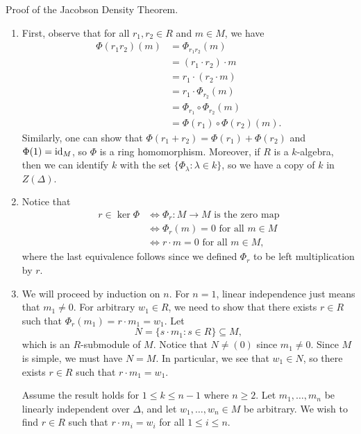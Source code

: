 {\sc Proof of the Jacobson Density Theorem.}
\begin{enumerate}[(1)]
    \item First, observe that for all $r_1, r_2 \in R$ and $m \in M$, we have
    \begin{align*}
        \Phi(r_1r_2)(m) &= \Phi_{r_1r_2}(m) \\
        &= (r_1 \cdot r_2) \cdot m \\
        &= r_1 \cdot (r_2 \cdot m) \\
        &= r_1 \cdot \Phi_{r_2}(m) \\
        &= \Phi_{r_1} \circ \Phi_{r_2}(m) \\
        &= \Phi(r_1) \circ \Phi(r_2)(m).
    \end{align*}
    Similarly, one can show that $\Phi(r_1 + r_2) = \Phi(r_1) + \Phi(r_2)$ and $\Phi(1) = \operatorname{id}_M$, so 
    $\Phi$ is a ring homomorphism. Moreover, if $R$ is a $k$-algebra, then we can identify 
    $k$ with the set $\{\Phi_\lambda : \lambda \in k\}$, so we have a copy of $k$ in $Z(\Delta)$. 
    
    \item Notice that 
    \begin{align*}
        r \in \ker\Phi &\iff \Phi_r : M \to M \text{ is the zero map} \\
        &\iff \Phi_r(m) = 0 \text{ for all $m \in M$} \\
        &\iff r \cdot m = 0 \text{ for all $m \in M$,}
    \end{align*}
    where the last equivalence follows since we defined $\Phi_r$ to be left multiplication by $r$.
    
    \item We will proceed by induction on $n$. For $n = 1$, linear independence just means that 
    $m_1 \neq 0$. For arbitrary $w_1 \in R$, we need to show that there exists $r \in R$ such that 
    $\Phi_r(m_1) = r \cdot m_1 = w_1$. Let 
    \[ N = \{s \cdot m_1 : s \in R\} \subseteq M, \]
    which is an $R$-submodule of $M$. Notice that $N \neq (0)$ since $m_1 \neq 0$. Since $M$ is 
    simple, we must have $N = M$. In particular, we see that $w_1 \in N$, so there exists 
    $r \in R$ such that $r \cdot m_1 = w_1$. 
    
    Assume the result holds for $1 \leq k \leq n-1$ where $n \geq 2$. Let $m_1, \dots, m_n$ be 
    linearly independent over $\Delta$, and let $w_1, \dots, w_n \in M$ be arbitrary. We wish to find 
    $r \in R$ such that $r \cdot m_i = w_i$ for all $1 \leq i \leq n$. 
    

\end{enumerate}
